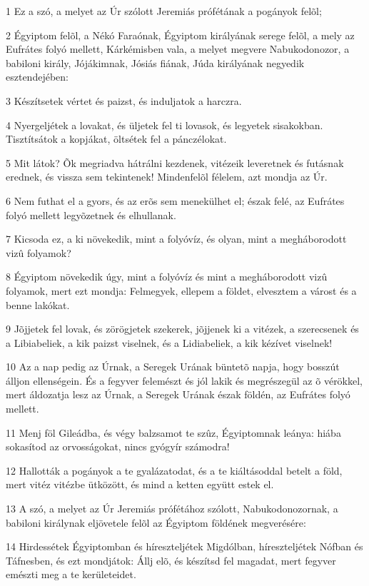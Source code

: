 \par 1 Ez a szó, a melyet az Úr szólott Jeremiás prófétának a pogányok felõl;
\par 2 Égyiptom felõl, a Nékó Faraónak, Égyiptom királyának serege felõl, a mely az Eufrátes folyó mellett, Kárkémisben vala, a melyet megvere Nabukodonozor, a babiloni király, Jójákimnak, Jósiás fiának, Júda királyának negyedik esztendejében:
\par 3 Készítsetek vértet és paizst, és induljatok a harczra.
\par 4 Nyergeljétek a lovakat, és üljetek fel ti lovasok, és legyetek sisakokban. Tisztítsátok a kopjákat, öltsétek fel a pánczélokat.
\par 5 Mit látok? Õk megriadva hátrálni kezdenek, vitézeik leveretnek és futásnak erednek, és vissza sem tekintenek! Mindenfelõl félelem, azt mondja az Úr.
\par 6 Nem futhat el a gyors, és az erõs sem menekülhet el; észak felé, az Eufrátes folyó mellett legyõzetnek és elhullanak.
\par 7 Kicsoda ez, a ki növekedik, mint a folyóvíz, és olyan, mint a megháborodott vizû folyamok?
\par 8 Égyiptom növekedik úgy, mint a folyóvíz és mint a megháborodott vizû folyamok, mert ezt mondja: Felmegyek, ellepem a földet, elvesztem a várost és a benne lakókat.
\par 9 Jõjjetek fel lovak, és zörögjetek szekerek, jõjjenek ki a vitézek, a szerecsenek és a Libiabeliek, a kik paizst viselnek, és a Lidiabeliek, a kik kézívet viselnek!
\par 10 Az a nap pedig az Úrnak, a Seregek Urának büntetõ napja, hogy bosszút álljon ellenségein. És a fegyver felemészt és jól lakik és megrészegül az õ vérökkel, mert áldozatja lesz az Úrnak, a Seregek Urának észak földén, az Eufrátes folyó mellett.
\par 11 Menj föl Gileádba, és végy balzsamot te szûz, Égyiptomnak leánya: hiába sokasítod az orvosságokat, nincs gyógyír számodra!
\par 12 Hallották a pogányok a te gyalázatodat, és a te kiáltásoddal betelt a föld, mert vitéz vitézbe ütközött, és mind a ketten együtt estek el.
\par 13 A szó, a melyet az Úr Jeremiás prófétához szólott, Nabukodonozornak, a babiloni királynak eljövetele felõl az Égyiptom földének megverésére:
\par 14 Hirdessétek Égyiptomban és híreszteljétek Migdólban, híreszteljétek Nófban és Táfnesben, és ezt mondjátok: Állj elõ, és készítsd fel magadat, mert fegyver emészti meg a te kerületeidet.
